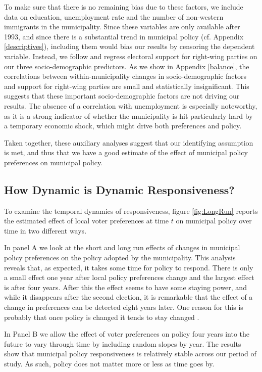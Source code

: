 \documentclass[a4paper,12pt]{article}
\begin{document}
To make sure that there is no remaining bias due to these factors, we include data on education, unemployment rate and the number of non-western immigrants in the municipality. Since these variables are only available after 1993, and since there is a substantial trend in municipal policy (cf. Appendix \ref{descriptives}), including them would bias our results by censoring the dependent variable. Instead, we follow \citep{pei2018poorly} and regress electoral support for right-wing parties on our three socio-demographic predictors. As we show in Appendix \ref{balance}, the correlations between within-municipality changes in socio-demographic factors and support for right-wing parties are small and statistically insignificant. This suggests that these important socio-demographic factors are not driving our results. The absence of a correlation with unemployment is especially noteworthy, as it is a strong indicator of whether the municipality is hit particularly hard by a temporary economic shock, which might drive both preferences and policy.

Taken together, these auxiliary analyses suggest that our identifying assumption is met, and thus that we have a good estimate of the effect of municipal policy preferences on municipal policy.

\subsection*{How Dynamic is Dynamic Responsiveness?}

To examine the temporal dynamics of responsiveness, figure \ref{fig:LongRun} reports the estimated effect of local voter preferences at time $t$ on municipal policy over time in two different ways. 

In panel A we look at the short and long run effects of changes in municipal policy preferences on the policy adopted by the municipality. This analysis reveals that, as expected, it takes some time for policy to respond. There is only a small effect one year after local policy preferences change and the largest effect is after four years. After this the effect seems to have some staying power, and while it disappears after the second election, it is remarkable that the effect of a change in preferences can be detected eight years later. One reason for this is probably that once policy is changed it tends to stay changed \citep[see, theories of punctuated equilibria, e.g.,]{baumgartner2009punctuated}.

In Panel B we allow the effect of voter preferences on policy four years into the future to vary through time by including random slopes by year. The results show that municipal policy responsiveness is relatively stable across our period of study. As such, policy does not matter more or less as time goes by.
\end{document}
